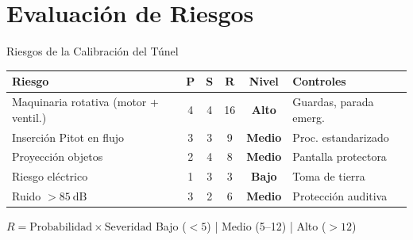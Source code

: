 \documentclass[aspectratio=169,12pt]{beamer}
\begin{document}
\section{Evaluación de Riesgos}

\begin{frame}{Riesgos de la Calibración del Túnel}
	\centering\small
	\begin{tabular}{>{\raggedright\arraybackslash}p{2.8cm} c c c c l}
		\toprule
		\textbf{Riesgo} & \textbf{P}                             & \textbf{S}         & $\boldsymbol{R}$
		                & \textbf{Nivel}                         & \textbf{Controles}                    \\
		\midrule
		\rowcolor{aerored!15}
		Maquinaria rotativa (motor + ventil.)
		                & 4                                      & 4                  & 16
		                & \textcolor{aerored}{\textbf{Alto}}
		                & Guardas, parada emerg.                                                         \\
		\rowcolor{aeroyellow!15}
		Inserción Pitot en flujo
		                & 3                                      & 3                  & 9
		                & \textcolor{aeroyellow}{\textbf{Medio}}
		                & Proc. estandarizado                                                            \\
		\rowcolor{aeroyellow!15}
		Proyección objetos
		                & 2                                      & 4                  & 8
		                & \textcolor{aeroyellow}{\textbf{Medio}}
		                & Pantalla protectora                                                            \\
		\rowcolor{aerogreen!15}
		Riesgo eléctrico
		                & 1                                      & 3                  & 3
		                & \textcolor{aerogreen}{\textbf{Bajo}}
		                & Toma de tierra                                                                 \\
		\rowcolor{aeroyellow!15}
		Ruido $>\SI{85}{\dB}$
		                & 3                                      & 2                  & 6
		                & \textcolor{aeroyellow}{\textbf{Medio}}
		                & Protección auditiva                                                            \\
		\bottomrule
	\end{tabular}

	\vspace{0.4em}
	\begin{block}{$R = \text{Probabilidad} \times \text{Severidad}$}
		Bajo ($<5$) \quad | \quad Medio (5--12) \quad | \quad Alto ($>12$)
	\end{block}
\end{frame}
\end{document}
